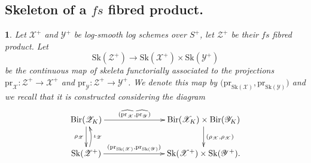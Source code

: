 \documentclass{amsart}%
\numberwithin{equation}{subsection}
\theoremstyle{plain2}
\theoremstyle{definition2}
\theoremstyle{stepstyle}
\theoremstyle{point}
\theoremstyle{subpoint}
\newtheorem{subpoint}[equation]{}%
\newcommand{\spa}[1]{\begin{subpoint}#1\end{subpoint}}           %
\newcommand{\cX}{\ensuremath{\mathscr{X}}}
\newcommand{\cY}{\ensuremath{\mathscr{Y}}}
\newcommand{\cZ}{\ensuremath{\mathscr{Z}}}
\renewcommand{\cY}{\ensuremath{\mathscr{Y}}}
\newcommand{\pr}{\mathrm{pr}}
\newcommand{\Sk}{\mathrm{Sk}}
\begin{document}
\subsection{Skeleton of a $fs$ fibred product.}
\spa{Let $\cX^+$ and $\cY^+$ be log-smooth log schemes over $S^+$, let $\cZ^+$ be their $fs$ fibred product. Let $$\Sk(\cZ^+) \rightarrow \Sk(\cX^+) \times \Sk(\cY^+)$$ be the continuous map of skeleta functorially associated to the projections $\pr_{\cX}:\cZ^+ \rightarrow \cX^+$ and $\pr_{\cY}:\cZ^+ \rightarrow \cY^+$. We denote this map by $\big(\pr_{\Sk(\cX)}, \pr_{\Sk(\cY)}\big)$ and we recall that it is constructed considering the diagram
\begin{equation} \label{diagram map on skeleta funct induced}
\begin{gathered}
\xymatrixcolsep{6pc} \xymatrix{
 \text{Bir}(\cZ_K) \ar[r]^-{(\widehat{\pr_{\cX}}, \widehat{\pr_{\cY}})} \ar[d]_{\rho_\cZ} & \text{Bir}(\cX_K) \times  \text{Bir}(\cY_K) \ar[d]^{(\rho_\cX, \rho_\cX)}\\
  \Sk(\cZ^+) \ar[r]^-{(\pr_{\Sk(\cX)}, \pr_{\Sk(\cY)})} \ar@/_/[u]_-{\iota_\cZ}  & \Sk(\cX^+) \times \Sk(\cY^+).
}
\end{gathered}\end{equation}
}
\end{document}
